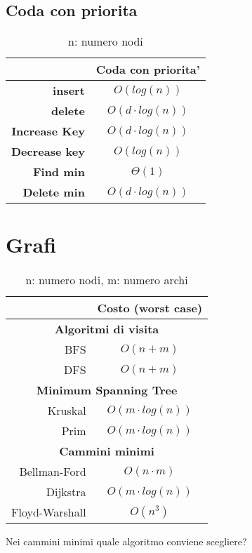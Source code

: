 \documentclass{article}
\begin{document}
\subsection{Coda con priorita}
\begin{table}[H]
    \centering
    \def\arraystretch{1.5}
    \begin{tabular}{|r|c|} \hline
          & \textbf{Coda con priorita'} \\ \hline
          \textbf{insert} & $O(log(n))$ \\ \hline
          \textbf{delete} & $O(d\cdot log(n))$ \\ \hline
          \textbf{Increase Key} & $O(d\cdot log(n))$ \\ \hline
          \textbf{Decrease key} & $O(log(n))$ \\ \hline
          \textbf{Find min} & $\Theta(1)$ \\ \hline
          \textbf{Delete min} & $O(d\cdot log(n))$ \\ \hline
    \end{tabular}
    \caption{n: numero nodi}
    \label{tab:my_label}
\end{table}
\section{Grafi}
\begin{table}[H]
    \centering
    \def\arraystretch{1.5}
    \begin{tabular}{|r|c|} \hline
         & \textbf{Costo (worst case)} \\ \hline \hline
         \multicolumn{2}{|c|}{\textbf{Algoritmi di visita}}\\  \hline
         BFS & $O(n+m)$\\ \hline
         DFS & $O(n+m)$\\ \hline  \hline
         \multicolumn{2}{|c|}{\textbf{Minimum Spanning Tree}}\\  \hline
         Kruskal & $O(m\cdot log(n))$\\ \hline
         Prim & $O(m\cdot log(n))$\\ \hline  \hline
         \multicolumn{2}{|c|}{\textbf{Cammini minimi}}\\ \hline
         Bellman-Ford & $O(n\cdot m)$\\ \hline
         Dijkstra & $O(m\cdot log(n))$\\ \hline
         Floyd-Warshall & $O(n^3)$\\ \hline
    \end{tabular}
    \caption{n: numero nodi, m: numero archi}
    \label{tab:my_label}
\end{table}
Nei cammini minimi quale algoritmo conviene scegliere? 
\end{document}
